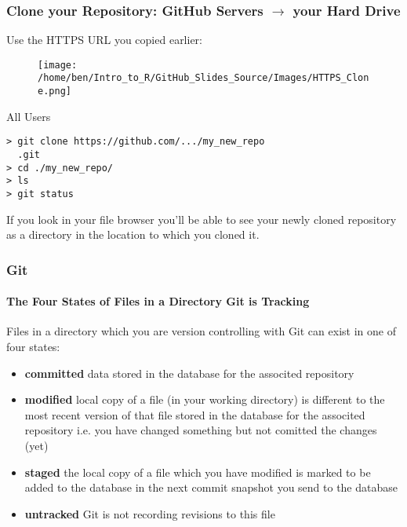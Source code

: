 \documentclass[xcolor=dvipsnames]{beamer}
\begin{document}
\begin{frame}[fragile]
\frametitle{Clone your Repository: GitHub Servers $\rightarrow$ your Hard Drive}
Use the HTTPS URL you copied earlier:\\
\begin{center}
\begin{figure}
\texttt{[image: /home/ben/Intro\_to\_R/GitHub\_Slides\_Source/Images/HTTPS\_Clone.png]}
\end{figure}
\end{center}

\begin{block}{All Users}
\begin{lstlisting}
> git clone https://github.com/.../my_new_repo
  .git
> cd ./my_new_repo/
> ls
> git status
\end{lstlisting}
\end{block}

If you look in your file browser you'll be able to see your newly cloned repository as a directory in the location to which you cloned it.

\end{frame}

\begin{frame} 
\frametitle{Git}
\framesubtitle{The Four States of Files in a Directory Git is Tracking}
Files in a directory which you are version controlling with Git can exist in one of four states:
\begin{itemize}
\item \textbf{committed} data stored in the database for the associted repository
\item \textbf{modified} local copy of a file (in your working directory) is different to the most recent version of that file stored in the database for the associted repository i.e. you have changed something but not comitted the changes (yet)
\item \textbf{staged} the local copy of a file which you have modified is marked to be added to the database in the next commit snapshot you send to the database
\item \textbf{untracked} Git is not recording revisions to this file 
\end{itemize}
\end{frame}
\end{document}
